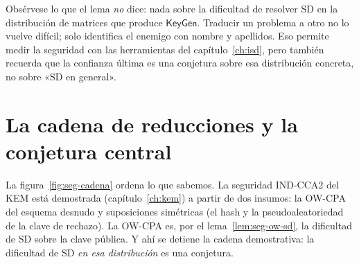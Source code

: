 \documentclass[11pt,a4paper,oneside]{report}
\begin{document}
Obsérvese lo que el lema \emph{no} dice: nada sobre la dificultad de
resolver SD en la distribución de matrices que produce
$\textsf{KeyGen}$. Traducir un problema a otro no lo vuelve difícil;
solo identifica el enemigo con nombre y apellidos. Eso permite medir
la seguridad con las herramientas del capítulo~\ref{ch:isd}, pero
también recuerda que la confianza última es una conjetura sobre esa
distribución concreta, no sobre «SD en general».

\section{La cadena de reducciones y la conjetura central}

La figura~\ref{fig:seg-cadena} ordena lo que sabemos. La seguridad
IND-CCA2 del KEM está demostrada (capítulo~\ref{ch:kem}) a partir de
dos insumos: la OW-CPA del esquema desnudo y suposiciones simétricas
(el hash y la pseudoaleatoriedad de la clave de rechazo). La OW-CPA
es, por el lema~\ref{lem:seg-ow-sd}, la dificultad de SD sobre la
clave pública. Y ahí se detiene la cadena demostrativa: la dificultad
de SD \emph{en esa distribución} es una conjetura.
\end{document}
